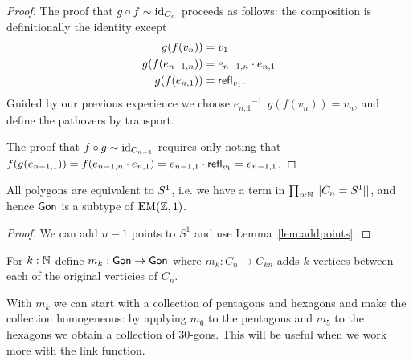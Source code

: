 \begin{proof}
The proof that \( g\circ f\sim\text{id}_{C_n} \) proceeds as follows: the composition is definitionally the identity except 
\begin{align*}
g(f(v_n))&=v_1\\
g(f(e_{n-1,n}))&=e_{n-1,n}\cdot e_{n,1}\\
g(f(e_{n,1}))&= \mathsf{refl}_{v_1}.
\end{align*}
Guided by our previous experience we choose \( {e_{n,1}}^{-1}:g(f(v_n))=v_n \), and define the pathovers by transport.

The proof that \( f\circ g\sim\text{id}_{C_{n-1}} \) requires only noting that \( f(g(e_{n-1,1}))=f(e_{n-1,n}\cdot e_{n,1})=e_{n-1,1}\cdot\mathsf{refl}_{v_1}=e_{n-1,1} \).
\end{proof}

\begin{mycor}
\label{cor:gon}
All polygons are equivalent to \( S^1 \), i.e. we have a term in \( \prod_{n:\mathbb{N}}||C_n=S^1|| \), and hence \( \mathsf{Gon} \) is a subtype of \( \mathrm{EM}(\mathbb{Z},1) \).
\end{mycor}
\begin{proof}
We can add \( n-1 \) points to \( S^1 \) and use Lemma~\ref{lem:addpoints}.
\end{proof}

\begin{mydef}
For \( k:\mathbb{N} \) define \( m_k:\mathsf{Gon}\to\mathsf{Gon} \) where \( m_k:C_n\to C_{kn} \) adds \( k \) vertices between each of the original verticies of \( C_n \).
\end{mydef}

With \( m_k \) we can start with a collection of pentagons and hexagons and make the collection homogeneous: by applying \( m_6 \) to the pentagons and \( m_5 \) to the hexagons we obtain a collection of 30-gons. This will be useful when we work more with the link function.

